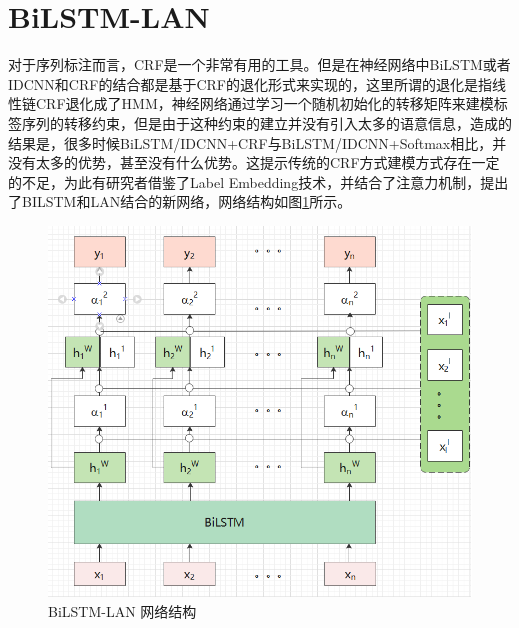 \documentclass[twoside,a4paper,12pt]{book}%
\begin{document}
\section{BiLSTM-LAN}
对于序列标注而言，\gls{CRF}是一个非常有用的工具。但是在神经网络中BiLSTM或者\gls{IDCNN}和\gls{CRF}的结合都是基于\gls{CRF}的退化形式来实现的，这里所谓的退化是指线性链\gls{CRF}退化成了\gls{HMM}，神经网络通过学习一个随机初始化的转移矩阵来建模标签序列的转移约束，但是由于这种约束的建立并没有引入太多的语意信息，造成的结果是，很多时候BiLSTM/\gls{IDCNN}+\gls{CRF}与BiLSTM/\gls{IDCNN}+Softmax相比，并没有太多的优势，甚至没有什么优势。这提示传统的\gls{CRF}方式建模方式存在一定的不足，为此有研究者借鉴了Label Embedding技术，并结合了注意力机制，提出了BILSTM和LAN结合的新网络，网络结构如图\ref{fig:bilstm-lan1}所示。
\begin{figure}[htbp]
\begin{center}
\includegraphics[width=5.6in]{figures/bilstm-lan1.png}
\caption{BiLSTM-LAN 网络结构}
\label{fig:bilstm-lan1}
\end{center}
\end{figure}
\end{document}

